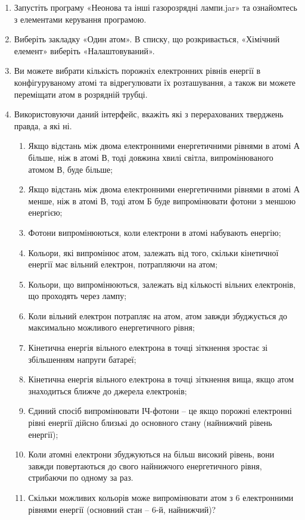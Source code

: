 \documentclass[a4paper,14pt]{extreport}
\begin{document}
\begin{enumerate}
\item Запустіть програму «Неонова та інші газорозрядні лампи.jar» та ознайомтесь з елементами керування програмою.\\

\item Виберіть закладку «Один атом». В списку, що розкривається, «Хімічний 
елемент» виберіть «Налаштовуваний».\\

\item Ви можете вибрати кількість порожніх електронних рівнів енергії в 
конфігуруваному атомі та відрегулювати їх розташування, а також ви можете 
переміщати атом в розрядній трубці.\\

\item Використовуючи даний інтерфейс, вкажіть які з перерахованих тверджень 
правда, а які ні.
	\begin{enumerate}
		\item Якщо відстань між двома електронними енергетичними рівнями в атомі 
		А більше, ніж в атомі В, тоді довжина хвилі світла, випромінюваного 
		атомом В, буде більше;
		\item Якщо відстань між двома електронними енергетичними рівнями в атомі 
		А менше, ніж в атомі В, тоді атом Б буде випромінювати фотони з 
		меншою енергією;
		\item Фотони випромінюються, коли електрони в атомі набувають енергію;
		\item Кольори, які випромінює атом, залежать від того, скільки кінетичної 
		енергії має вільний електрон, потрапляючи на атом;
		\item Кольори, що випромінюються, залежать від кількості вільних 
		електронів, що проходять через лампу;
		\item Коли вільний електрон потрапляє на атом, атом завжди збуджується до 
		максимально можливого енергетичного рівня;
		\item Кінетична енергія вільного електрона в точці зіткнення зростає зі 
		збільшенням напруги батареї;
		\item Кінетична енергія вільного електрона в точці зіткнення вища, якщо атом 
		знаходиться ближче до джерела електронів;
		\item Єдиний спосіб випромінювати ІЧ-фотони – це якщо порожні електронні 
		рівні енергії дійсно близькі до основного стану (найнижчий рівень 
		енергії);
		\item Коли атомні електрони збуджуються на більш високий рівень, вони 
		завжди повертаються до свого найнижчого енергетичного рівня, 
		стрибаючи по одному за раз.
		\item Скільки можливих кольорів може випромінювати атом з 6 
		електронними рівнями енергії (основний стан – 6-й, найнижчий)?
	\end{enumerate}


\end{enumerate}
\end{document}
